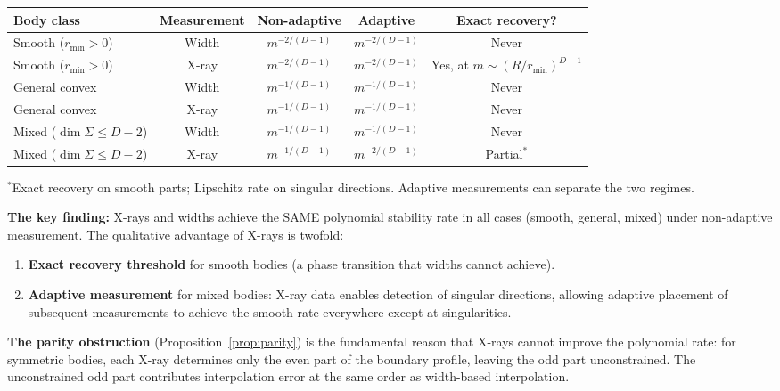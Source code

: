 \begin{center}
\renewcommand{\arraystretch}{1.4}
\begin{tabular}{lcccc}
\toprule
\textbf{Body class} & \textbf{Measurement} & \textbf{Non-adaptive} & \textbf{Adaptive} & \textbf{Exact recovery?} \\
\midrule
Smooth ($r_{\min} > 0$) & Width & $m^{-2/(D-1)}$ & $m^{-2/(D-1)}$ & Never \\
Smooth ($r_{\min} > 0$) & X-ray & $m^{-2/(D-1)}$ & $m^{-2/(D-1)}$ & Yes, at $m \sim (R/r_{\min})^{D-1}$ \\
\midrule
General convex & Width & $m^{-1/(D-1)}$ & $m^{-1/(D-1)}$ & Never \\
General convex & X-ray & $m^{-1/(D-1)}$ & $m^{-1/(D-1)}$ & Never \\
\midrule
Mixed ($\dim\Sigma \leq D-2$) & Width & $m^{-1/(D-1)}$ & $m^{-1/(D-1)}$ & Never \\
Mixed ($\dim\Sigma \leq D-2$) & X-ray & $m^{-1/(D-1)}$ & $m^{-2/(D-1)}$ & Partial$^*$ \\
\bottomrule
\end{tabular}
\end{center}

{\small $^*$Exact recovery on smooth parts; Lipschitz rate on singular directions. Adaptive measurements can separate the two regimes.}

\bigskip

\textbf{The key finding:} X-rays and widths achieve the SAME polynomial stability rate in all cases (smooth, general, mixed) under non-adaptive measurement. The qualitative advantage of X-rays is twofold:
\begin{enumerate}
  \item \textbf{Exact recovery threshold} for smooth bodies (a phase transition that widths cannot achieve).
  \item \textbf{Adaptive measurement} for mixed bodies: X-ray data enables detection of singular directions, allowing adaptive placement of subsequent measurements to achieve the smooth rate everywhere except at singularities.
\end{enumerate}

\textbf{The parity obstruction} (Proposition~\ref{prop:parity}) is the fundamental reason that X-rays cannot improve the polynomial rate: for symmetric bodies, each X-ray determines only the even part of the boundary profile, leaving the odd part unconstrained. The unconstrained odd part contributes interpolation error at the same order as width-based interpolation.

